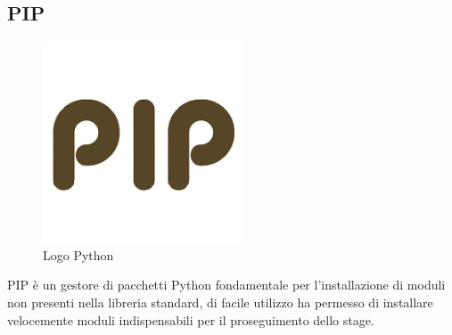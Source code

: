 \subsection{PIP}
\begin{figure}[H]
	\begin{center} \includegraphics[scale=0.2]{figures/pip}
		\caption[Bin packing figures]{Logo Python}
	\end{center}
\end{figure}
PIP è un gestore di pacchetti Python fondamentale per l'installazione di moduli non presenti nella libreria standard, di facile utilizzo ha permesso di installare velocemente moduli indispensabili per il proseguimento dello stage.